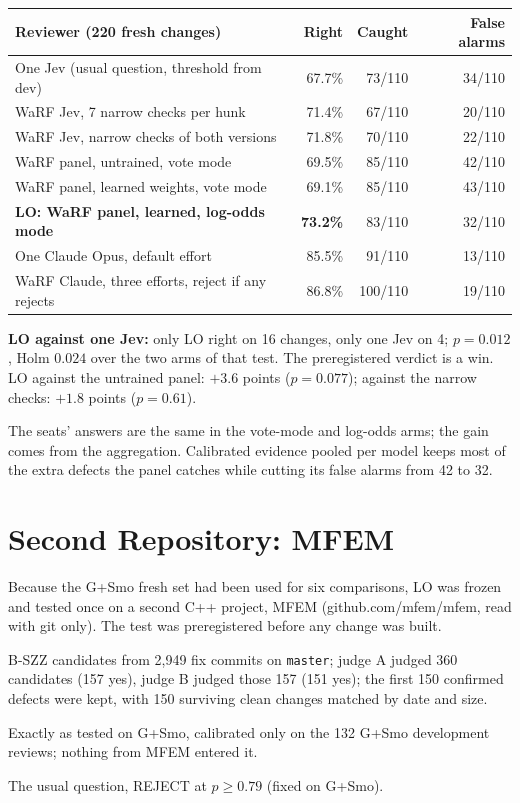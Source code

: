 \documentclass[11pt,a4paper]{article}
\begin{document}
\begin{center}
\begin{tabular}{lrrr}
\toprule
Reviewer (220 fresh changes) & Right & Caught & False alarms \\
\midrule
One Jev (usual question, threshold from dev)      & 67.7\% & 73/110 & 34/110 \\
WaRF Jev, 7 narrow checks per hunk                & 71.4\% & 67/110 & 20/110 \\
WaRF Jev, narrow checks of both versions          & 71.8\% & 70/110 & 22/110 \\
WaRF panel, untrained, vote mode                  & 69.5\% & 85/110 & 42/110 \\
WaRF panel, learned weights, vote mode            & 69.1\% & 85/110 & 43/110 \\
\textbf{LO: WaRF panel, learned, log-odds mode}   & \textbf{73.2\%} & 83/110 & 32/110 \\
\midrule
One Claude Opus, default effort                   & 85.5\% & 91/110 & 13/110 \\
WaRF Claude, three efforts, reject if any rejects & 86.8\% & 100/110 & 19/110 \\
\bottomrule
\end{tabular}
\end{center}

\textbf{LO against one Jev:} only LO right on 16 changes, only one Jev on 4;
$p = 0.012$, Holm $0.024$ over the two arms of that test. The preregistered
verdict is a win. LO against the untrained panel: $+3.6$ points ($p = 0.077$);
against the narrow checks: $+1.8$ points ($p = 0.61$).

The seats' answers are the same in the vote-mode and log-odds arms; the gain
comes from the aggregation. Calibrated evidence pooled per model keeps most of
the extra defects the panel catches while cutting its false alarms from 42 to 32.

\section{Second Repository: MFEM}

Because the G+Smo fresh set had been used for six comparisons, LO was frozen
and tested once on a second C++ project, MFEM (github.com/mfem/mfem, read with
git only). The test was preregistered before any change was built.

\begin{description}[leftmargin=1.5em]
\item[Set] B-SZZ candidates from 2,949 fix commits on \texttt{master}; judge A
  judged 360 candidates (157 yes), judge B judged those 157 (151 yes); the first
  150 confirmed defects were kept, with 150 surviving clean changes matched by
  date and size.
\item[LO] Exactly as tested on G+Smo, calibrated only on the 132 G+Smo
  development reviews; nothing from MFEM entered it.
\item[One Jev] The usual question, REJECT at $p \ge 0.79$ (fixed on G+Smo).
\end{description}
\end{document}
